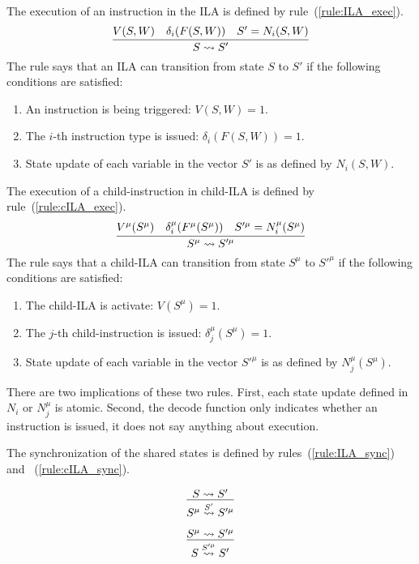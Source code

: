 \documentclass[letterpaper, 11 pt]{article}  %
\begin{document}
The execution of an instruction in the ILA is defined by 
rule~(\ref{rule:ILA_exec}).
%
\begin{equation}
  \infer{S \rightsquigarrow S'}
        {V(S, W) & \delta_i(F(S, W)) & S' = N_i(S, W)}
  \label{rule:ILA_exec}
\end{equation}
%
The rule says that an ILA can transition from state $S$ to $S'$ if the following 
conditions are satisfied:
\begin{enumerate}
  \item An instruction is being triggered: $V(S, W) = 1$.
  \item The $i$-th instruction type is issued: $\delta_i(F(S, W)) = 1$.
  \item State update of each variable in the vector $S'$ is as defined by 
        $N_i (S, W)$.
\end{enumerate}

The execution of a child-instruction in child-ILA is defined by 
rule~(\ref{rule:cILA_exec}).
\begin{equation}
  \infer{S^\mu \rightsquigarrow S'^\mu}
        {V^\mu(S^\mu) & \delta_i^\mu(F^\mu(S^\mu)) & S'^\mu = N_i^\mu(S^\mu)}
  \label{rule:cILA_exec}
\end{equation}
The rule says that a child-ILA can transition from state $S^\mu$ to $S'^\mu$ if 
the following conditions are satisfied:
\begin{enumerate}
  \item The child-ILA is activate: $V(S^\mu) = 1$.
  \item The $j$-th child-instruction is issued: $\delta_j^\mu(S^\mu) = 1$.
  \item State update of each variable in the vector $S'^\mu$ is as defined by 
        $N_j^\mu (S^\mu)$.
\end{enumerate}

There are two implications of these two rules.
First, each state update defined in $N_i$ or $N_j^\mu$ is atomic.
Second, the decode function only indicates whether an instruction is issued, it 
does not say anything about execution.

The synchronization of the shared states is defined by 
rules~(\ref{rule:ILA_sync}) and ~(\ref{rule:cILA_sync}).

\begin{equation}
  \infer{S^\mu \overset{S'}{\rightsquigarrow} S'^\mu}
        {S \rightsquigarrow S'}
  \label{rule:ILA_sync}
\end{equation}

\begin{equation}
  \infer{S \overset{S'^\mu}{\rightsquigarrow} S'}
        {S^\mu \rightsquigarrow S'^\mu}
  \label{rule:cILA_sync}
\end{equation}
\end{document}
